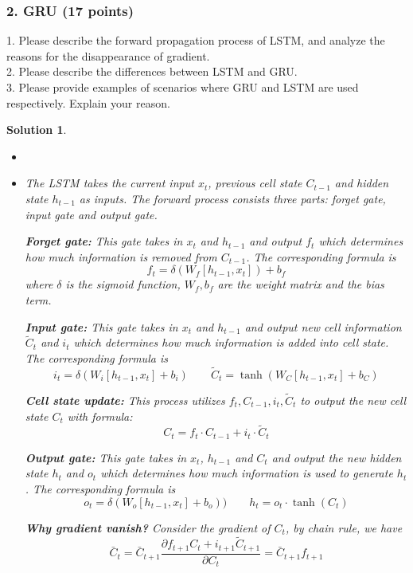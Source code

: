 \documentclass[12pt]{article}%
\newtheorem{solution}[theorem]{Solution}
\begin{document}
    \newpage


    \subsubsection*{2. GRU (17 points)}

    1. Please describe the forward propagation process of LSTM, and analyze the reasons for the disappearance of gradient.\\
    2. Please describe the differences between LSTM and GRU.\\
    3. Please provide examples of scenarios where GRU and LSTM are used respectively. Explain your reason.

    \begin{solution}
        \begin{itemize}
            \item [  ]
            \item [1.] The LSTM takes the current input $x_t$, previous cell state $C_{t-1}$ and hidden state $h_{t-1}$ as inputs.
            The forward process consists three parts: forget gate, input gate and output gate.
            \par {\bf Forget gate:} This gate takes in $x_t$ and $h_{t-1}$ and output $f_t$ which determines how much information is removed from $C_{t-1}$.
            The corresponding formula is \[f_t = \delta(W_f[h_{t-1},x_t])+b_f\] where $\delta$ is the sigmoid function, $W_f,b_f$ are the weight matrix and the bias term.
            \par {\bf Input gate:} This gate takes in $x_t$ and $h_{t-1}$ and output new cell information $\widetilde{C}_{t}$ and $i_t$ which determines how much information is added into cell state.
            The corresponding formula is \[i_t = \delta(W_i[h_{t-1},x_t]+b_i)\qquad \widetilde{C}_t=\tanh(W_C[h_{t-1},x_t]+b_C)\]
            \par {\bf Cell state update:} This process utilizes $f_t,C_{t-1},i_t,\widetilde{C}_t$ to output the new cell state $C_t$ with formula:
            \[C_t = f_t\cdot C_{t-1} + i_t\cdot \widetilde{C}_t\]
            \par {\bf Output gate:} This gate takes in $x_t$, $h_{t-1}$ and $C_t$ and output the new hidden state $h_{t}$ and $o_t$ which determines how much information is used to generate $h_t$.
            The corresponding formula is \[o_t = \delta(W_o[h_{t-1},x_t]+b_o))\qquad h_t=o_t\cdot \tanh(C_t)\]
            \par {\bf Why gradient vanish?} Consider the gradient of $C_t$, by chain rule, we have \[\bar{C}_t=\bar{C}_{t+1}\frac{\partial f_{t+1}C_t+i_{t+1}\widetilde{C}_{t+1}}{\partial C_t}=\bar{C}_{t+1}f_{t+1}\]

\end{itemize}
\end{solution}
\end{document}
